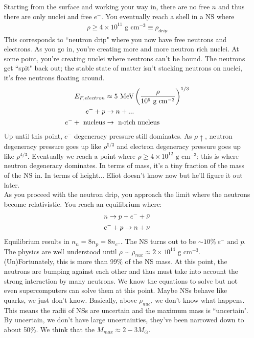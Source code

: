 Starting from the surface and working your way in, there are no free $n$ and thus there are only nuclei and free $e^-$. You eventually reach a shell in a NS where
\begin{align}
\rho \geq 4 \times 10^{11} \textrm{ g cm}^{-3} \equiv \rho_{drip}
\end{align}
This corresponds to ``neutron drip" where you now have free neutrons and electrons. As you go in, you're creating more and more neutron rich nuclei. At some point, you're creating nuclei where neutrons can't be bound. The neutrons get ``spit" back out; the stable state of matter isn't stacking neutrons on nuclei, it's free neutrons floating around. 
\begin{align}
E_{F,electron}& \approx 5 \textrm{ MeV} \left( \frac{\rho}{10^9 \textrm{ g cm}^{-3}} \right)^{1/3}\\
e^- + p &\rightarrow n + ...\\
e^- + \textrm{ nucleus} &\rightarrow \textrm{ n-rich nucleus}
\end{align}
Up until this point, $e^-$ degeneracy pressure still dominates. As $\rho \uparrow$, neutron degeneracy pressure goes up like $\rho^{5/3}$ and electron degeneracy pressure goes up like $\rho^{4/3}$. Eventually we reach a point where $\rho \geq 4 \times 10^{12} \textrm{ g cm}^{-3}$; this is where neutron degeneracy dominates. In terms of mass, it's a tiny fraction of the mass of the NS in. In terms of height... Eliot doesn't know now but he'll figure it out later. \\

As you proceed with the neutron drip, you approach the limit where the neutrons become relativistic. You reach an equilibrium where:
\begin{align}
n \rightarrow  p + e^- + \bar{\nu}\\
e^- + p \rightarrow n + \nu
\end{align}
Equilibrium results in $n_n = 8 n_p= 8n_{e^-}$. The NS turns out to be $\sim 10\% ~e^- \textrm{ and } p$. The physics are well understood until $\rho \sim \rho_{nuc} \approx 2 \times 10^{14} \textrm{ g cm}^{-3}$. (Un)Fortunately, this is more than 99\% of the NS mass. At this point, the neutrons are bumping against each other and thus must take into account the strong interaction by many neutrons. We know the equations to solve but not even supercomputers can solve them at this point. Maybe NSs behave like quarks, we just don't know. Basically, above $\rho_{nuc}$, we don't know what happens. This means the radii of NSs are uncertain and the maximum mass is ``uncertain". By uncertain, we don't have large uncertainties, they've been narrowed down to about 50\%. We think that the $M_{max} \approx 2 -3M_\odot$. 

